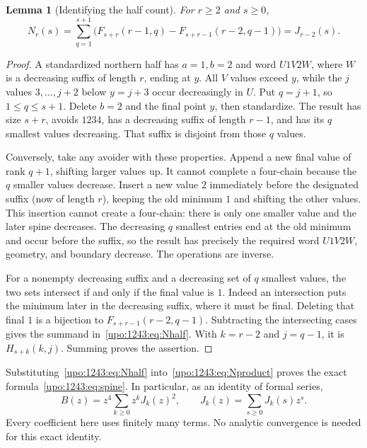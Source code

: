 \documentclass[11pt,letterpaper]{article}
\newtheorem{lemma}[theorem]{Lemma}
\theoremstyle{remark}\newtheorem{remark}[theorem]{Remark}
\numberwithin{equation}{section}
\begin{document}
\begin{lemma}[Identifying the half count]\label{upo:1243:lem:half}
For $r\ge2$ and $s\ge0$,
\begin{equation}\label{upo:1243:eq:Nhalf}
 N_r(s)=\sum_{q=1}^{s+1}
 \bigl(F_{s+r}(r-1,q)-F_{s+r-1}(r-2,q-1)\bigr)
 =J_{r-2}(s).
\end{equation}
\end{lemma}
\begin{proof}
A standardized northern half has $a=1,b=2$ and word $U1V2W$, where $W$
is a decreasing suffix of length $r$, ending at $y$. All $V$ values
exceed $y$, while the $j$ values $3,\ldots,j+2$ below $y=j+3$ occur
decreasingly in $U$. Put $q=j+1$, so $1\le q\le s+1$. Delete $b=2$ and
the final point $y$, then standardize. The result has size $s+r$, avoids
$1234$, has a decreasing suffix of length $r-1$, and has its $q$ smallest
values decreasing. That suffix is disjoint from those $q$ values.

Conversely, take any avoider with these properties. Append a new final
value of rank $q+1$, shifting larger values up. It cannot complete a
four-chain because the $q$ smaller values decrease. Insert a new value
$2$ immediately before the designated suffix (now of length $r$),
keeping the old minimum $1$ and shifting the other values. This insertion
cannot create a four-chain: there is only one smaller value and the
later spine decreases. The decreasing $q$ smallest entries end at the
old minimum and occur before the suffix, so the result has precisely the
required word $U1V2W$, geometry, and boundary decrease. The operations
are inverse.

For a nonempty decreasing suffix and a decreasing set of $q$ smallest
values, the two sets intersect if and only if the final value is $1$.
Indeed an intersection puts the minimum later in the decreasing suffix,
where it must be final. Deleting that final $1$ is a bijection to
$F_{s+r-1}(r-2,q-1)$. Subtracting the intersecting cases gives the
summand in~\eqref{upo:1243:eq:Nhalf}. With $k=r-2$ and $j=q-1$, it is
$H_{s+k}(k,j)$. Summing proves the assertion.
\end{proof}

Substituting~\eqref{upo:1243:eq:Nhalf} into~\eqref{upo:1243:eq:Nproduct} proves the exact
formula~\eqref{upo:1243:eq:spine}. In particular, as an identity of formal series,
\begin{equation}\label{upo:1243:eq:formal}
 B(z)=z^4\sum_{k\ge0}z^kJ_k(z)^2,
 \qquad J_k(z)=\sum_{s\ge0}J_k(s)z^s.
\end{equation}
Every coefficient here uses finitely many terms. No analytic convergence
is needed for this exact identity.
\end{document}

